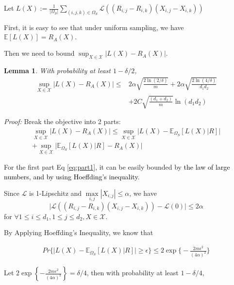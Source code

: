 \documentclass[conference]{IEEEtran}
\numberwithin{equation}{section}
\newcommand{\laks}[1]{\textcolor{black}{#1}}
\newcommand{\supX}{\sup_{X \in \mathcal{X}}}
\newcommand{\E}{\mathbb{E}}
\newtheorem{lemma}{Lemma}
\newtheorem{sampling strategy}{Sampling Strategy}
\begin{document}
Let $\displaystyle L(X) := \frac{1}{|\Omega_S|} \sum_{(i,j,k) \in \Omega_S}  \mathcal{L}( (R_{i,j} - R_{i,k})(X_{i,j} - X_{i,k}) )$

First, it is easy to see that under uniform sampling, we have $\mathbb{E}[L(X)] = R_A(X)$. 

Then we need to bound $\sup_{X \in \mathcal{X} } |L(X) - R_A(X)| $.

\begin{lemma}
\label{lemma:bound}
    With probability at least $1 - \delta/2$, 
    \begin{equation}
    \begin{aligned}
        \supX |L(X) - R_A(X)| \leq & 2 \alpha \sqrt{\frac{2\ln(2/\delta)}{m}} + 2\alpha \sqrt{ \frac{2\ln(4/\delta) }{d_1 d_2} } \\
        & + 2 C \sqrt{\frac{(d_1 + d_2)}{m}} \ln(d_1 d_2)
    \end{aligned}
    \end{equation}
\end{lemma}

\emph{Proof:}
Break the objective into 2 parts: 
    \begin{align}
        \supX \Big|L(X) - R_A(X)\Big| \leq \supX \Big|L(X) - \mathbb{E}_{\Omega_S} [L(X) | R] \Big| \label{eq:part1}  \\ 
        + \supX \Big|\mathbb{E}_{\Omega_S} [L(X) | R] - R_A(X) \Big| \label{eq:part2}
    \end{align}

For the first part Eq \ref{eq:part1}, it can be easily bounded by \laks{the law of large numbers, and by using Hoeffding's inequality}.

Since $\mathcal{L}$ is 1-Lipschitz and $\underset{i,j}{\max} |X_{i,j}| \leq \alpha$, we have 
\[\Big|\mathcal{L}((R_{i,j} - R_{i,k})(X_{i,j} - X_{i,k})) - \mathcal{L}(0) \Big| \leq 2\alpha \] 
for $\forall 1 \leq i \leq d_1, 1 \leq j \leq d_2,  X \in \mathcal{X}$.

By Applying Hoeffding's Inequality, we know that

\begin{align}
    Pr\Big\{ \big|L(X) - \E_{\Omega_S}[ L(X) | R ]  \big| \geq \epsilon \Big\} \leq 2 \exp\Big\{-\frac{2m \epsilon^2}{(4\alpha)^2} \Big\} \nonumber
\end{align}

Let $2 \exp\left\{-\frac{2m \epsilon^2}{(4\alpha)^2} \right\} = \delta/4$, then with probability at least $1 - \delta/4$,
\end{document}
